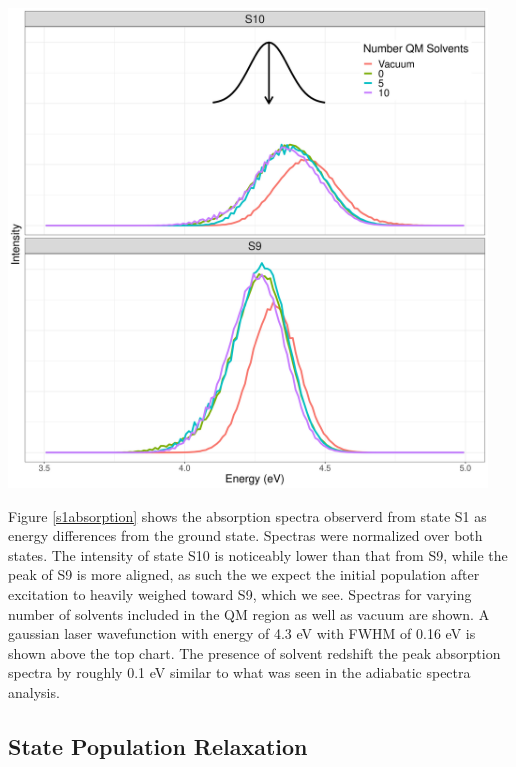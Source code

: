 \noindent
\begin{minipage}[c]{\textwidth}
  \centering
  \includegraphics[width=5in]{../Paper2/Images/pulse_pump/spectra.png}
  \label{s1absorption}
\end{minipage}\bigskip

Figure \ref{s1absorption} shows the absorption spectra observerd from state S1 as energy differences from the ground state.
Spectras were normalized over both states.
The intensity of state S10 is noticeably lower than that from S9, while the peak of S9 is more aligned, as such the we expect the initial population after excitation to heavily weighed toward S9, which we see.
Spectras for varying number of solvents included in the QM region as well as vacuum are shown.
A gaussian laser wavefunction with energy of 4.3 eV with FWHM of 0.16 eV is shown above the top chart.
The presence of solvent redshift the peak absorption spectra by roughly 0.1 eV similar to what was seen in the adiabatic spectra analysis.

\subsection{State Population Relaxation}

